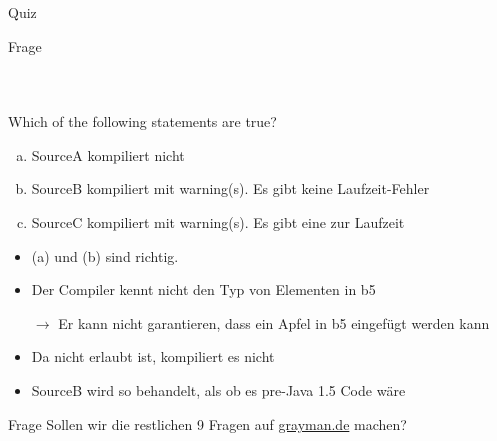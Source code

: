 \documentclass[usepdftitle=false,hyperref={pdfpagelabels=false}]{beamer}
\begin{document}
\begin{frame}{Quiz}
    \begin{block}{Frage}
        \begin{minipage}[b]{0.45\linewidth}
            \inputminted[linenos=true, numbersep=5pt, tabsize=4, fontsize=\tiny, label=SourceA.java, frame=lines]{java}{SourceA.java}
            \inputminted[linenos=true, numbersep=5pt, tabsize=4, fontsize=\tiny, label=SourceB.java, frame=lines]{java}{SourceB.java}
        \end{minipage}
        \hspace{0.5cm}
        \begin{minipage}[b]{0.45\linewidth}
            \inputminted[linenos=true, numbersep=5pt, tabsize=4, fontsize=\tiny, label=SourceC.java, frame=lines]{java}{SourceC.java}
            Which of the following statements are true?
        \end{minipage}
    \end{block}

    \begin{overprint}
    \begin{enumerate}[(a)]
        \item SourceA kompiliert nicht
        \item SourceB kompiliert mit warning(s). Es gibt keine
              Laufzeit-Fehler
        \item SourceC kompiliert mit warning(s). Es gibt eine
               zur Laufzeit
    \end{enumerate}
        \begin{itemize}
            \item (a) und (b) sind richtig.
            \item Der Compiler kennt nicht den Typ von Elementen in b5
            \item[$\rightarrow$] Er kann nicht garantieren, dass ein
                  Apfel in b5 eingefügt werden kann
            \item Da  nicht erlaubt ist, kompiliert es nicht
            \item SourceB wird so behandelt, als ob es pre-Java 1.5 Code wäre
        \end{itemize}
    \end{overprint}
\end{frame}

\begin{frame}{Frage}
    Sollen wir die restlichen 9 Fragen auf \href{http://www.grayman.de/quiz/java-generics-en.quiz}{grayman.de} machen?
\end{frame}
\end{document}
